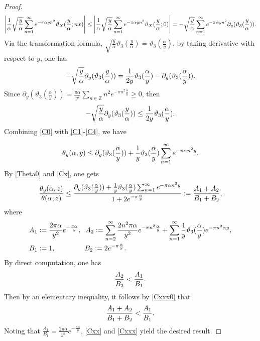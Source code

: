 \documentclass[reqno,english]{amsart}
\newtheorem{open problem}{Open Problem}[section]
\newtheorem{open question}{Open Question}[section]
\newtheorem{open questions on hexagonal lattice}{Open Questions on hexagonal lattice}[section]
\begin{document}
\begin{proof}
  \begin{equation}\aligned\label{C2}
\left|\frac{1}{\alpha}\sqrt\frac{y}{\alpha}\sum_{n=1}^\infty e^{-\pi\alpha yn^2}\vartheta_X(\frac{y}{\alpha};nx)\right|
\leq\left|\frac{1}{\alpha}\sqrt\frac{y}{\alpha}\sum_{n=1}^\infty e^{-\pi\alpha yn^2}\vartheta_X(\frac{y}{\alpha};0)\right|
=-\sqrt\frac{y}{\alpha}\sum_{n=1}^\infty e^{-\pi\alpha yn^2}\partial_y(\vartheta_3(\frac{y}{\alpha})).
\endaligned\end{equation}
Via the transformation formula, $\sqrt{\frac{y}{\alpha}}\vartheta_3(\frac{y}{\alpha})=\vartheta_3(\frac{\alpha}{y})$,
by taking derivative with respect to $y$, one has
\begin{equation}\aligned\label{C3}
-\sqrt{\frac{y}{\alpha}}\partial_y(\vartheta_3(\frac{y}{\alpha}))
=\frac{1}{2y}\vartheta_3(\frac{\alpha}{y})-\partial_y(\vartheta_3(\frac{\alpha}{y})).
\endaligned\end{equation}
Since $\partial_y(\vartheta_3(\frac{\alpha}{y}))=\frac{\pi\alpha}{y^2}\sum_{n\in\mathbb{Z}}n^2 e^{-\pi n^2\frac{\alpha}{y}}\geq0$, then
\begin{equation}\aligned\label{C4}
-\sqrt{\frac{y}{\alpha}}\partial_y(\vartheta_3(\frac{y}{\alpha}))
\leq\frac{1}{2y}\vartheta_3(\frac{\alpha}{y}).
\endaligned\end{equation}
Combining \eqref{C0} with \eqref{C1}-\eqref{C4}, we have

 \begin{equation}\aligned\label{Cx}
\theta_y(\alpha,y)\leq\partial_y(\vartheta_3(\frac{\alpha}{y}))+\frac{1}{ y}\vartheta_3(\frac{\alpha}{y})\sum_{n=1}^\infty e^{-\pi\alpha n^2 y}.
 \endaligned\end{equation}
By \eqref{Theta0} and \eqref{Cx}, one gets
 \begin{equation}\aligned\label{Cxx}
\frac{\theta_y(\alpha,z)}{\theta(\alpha,z)}
\leq\frac{\partial_y(\vartheta_3(\frac{\alpha}{y}))+\frac{1}{ y}\vartheta_3(\frac{\alpha}{y})\sum_{n=1}^\infty e^{-\pi\alpha n^2 y}}{1+2e^{-\pi\frac{\alpha}{y}}}
:=\frac{A_1+A_2}{B_1+B_2},
 \endaligned\end{equation}
where
 \begin{equation}\aligned\nonumber
&A_1:=\frac{2\pi\alpha}{y^2}e^{-\frac{\pi\alpha}{y}}, \;\;A_2:=\sum_{n=2}^\infty \frac{2n^2\pi\alpha}{y^2}e^{-\pi n^2\frac{\alpha}{y}}
+\sum_{n=1}^\infty\frac{1}{ y}\vartheta_3(\frac{\alpha}{y})e^{-\pi n^2\alpha y},\\
&B_1:=1,\;\;\;\;\;\;\;\;\;\;\;\;\;\;\; B_2:=2e^{-\pi\frac{\alpha}{y}}.
 \endaligned\end{equation}
By direct computation, one has
 \begin{equation}\aligned\label{Cxxx0}
\frac{A_2}{B_2}<\frac{A_1}{B_1}.
 \endaligned\end{equation}
Then by an elementary inequality, it follows by \eqref{Cxxx0} that
 \begin{equation}\aligned\label{Cxxx}
\frac{A_1+A_2}{B_1+B_2}<\frac{A_1}{B_1}.
 \endaligned\end{equation}
Noting that $\frac{A_1}{B_1}=\frac{2\pi\alpha}{y^2}e^{-\frac{\pi\alpha}{y}}$, \eqref{Cxx} and \eqref{Cxxx} yield the desired result.
\end{proof}
\end{document}
